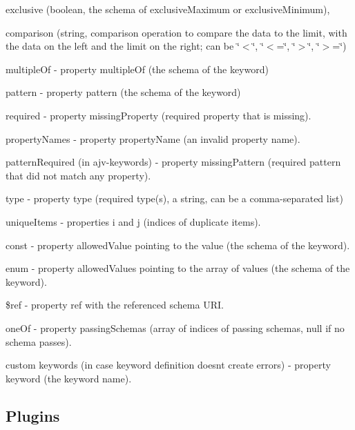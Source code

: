 \begin{DoxyItemize}
\begin{DoxyItemize}
\item {\ttfamily exclusive} (boolean, the schema of {\ttfamily exclusive\+Maximum} or {\ttfamily exclusive\+Minimum}),
\item {\ttfamily comparison} (string, comparison operation to compare the data to the limit, with the data on the left and the limit on the right; can be \char`\"{}$<$\char`\"{}, \char`\"{}$<$=\char`\"{}, \char`\"{}$>$\char`\"{}, \char`\"{}$>$=\char`\"{})
\end{DoxyItemize}
\item {\ttfamily multiple\+Of} -\/ property {\ttfamily multiple\+Of} (the schema of the keyword)
\item {\ttfamily pattern} -\/ property {\ttfamily pattern} (the schema of the keyword)
\item {\ttfamily required} -\/ property {\ttfamily missing\+Property} (required property that is missing).
\item {\ttfamily property\+Names} -\/ property {\ttfamily property\+Name} (an invalid property name).
\item {\ttfamily pattern\+Required} (in ajv-\/keywords) -\/ property {\ttfamily missing\+Pattern} (required pattern that did not match any property).
\item {\ttfamily type} -\/ property {\ttfamily type} (required type(s), a string, can be a comma-\/separated list)
\item {\ttfamily unique\+Items} -\/ properties {\ttfamily i} and {\ttfamily j} (indices of duplicate items).
\item {\ttfamily const} -\/ property {\ttfamily allowed\+Value} pointing to the value (the schema of the keyword).
\item {\ttfamily enum} -\/ property {\ttfamily allowed\+Values} pointing to the array of values (the schema of the keyword).
\item {\ttfamily \$ref} -\/ property {\ttfamily ref} with the referenced schema U\+RI.
\item {\ttfamily one\+Of} -\/ property {\ttfamily passing\+Schemas} (array of indices of passing schemas, null if no schema passes).
\item custom keywords (in case keyword definition doesn\textquotesingle{}t create errors) -\/ property {\ttfamily keyword} (the keyword name).
\end{DoxyItemize}

\subsection*{Plugins}

